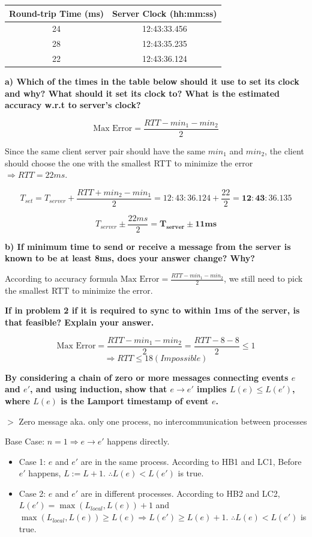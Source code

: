\documentclass[12pt,a4paper]{article}
\newcommand{\remark}[1]{
    $>$ {\color{blue} #1}
}
\begin{document}
\begin{center}
\begin{tabular}{|c|c|}
\hline
Round-trip Time (ms) & Server Clock (hh:mm:ss) \\ \hline
24 & 12:43:33.456 \\ \hline
28 & 12:43:35.235 \\ \hline
22 & 12:43:36.124 \\ \hline
\end{tabular}
\end{center}

\textbf{a) Which of the times in the table below should it use to set its clock and why? What should it set its clock to? What is the estimated accuracy w.r.t to server's clock?}

\[\text{Max Error} = \frac{RTT - min_1 - min_2}{2}\]

Since the same client server pair should have the same $min_1$ and $min_2$, the client should choose the one with the smallest RTT to minimize the error $\Rightarrow RTT = 22ms$.

\[T_{set} = T_{server} + \frac{RTT + min_2 - min_1}{2} = 12:43:36.124 + \frac{22}{2} = \mathbf{12:43:36.135}\]

\[T_{server} \pm \frac{22ms}{2} = \mathbf{T_{server} \pm 11ms}\]

\textbf{b) If minimum time to send or receive a message from the server is known to be at least 8ms, does your answer change? Why?}

According to accuracy formula $\text{Max Error} = \frac{RTT - min_1 - min_2}{2}$, we still need to pick the smallest RTT to minimize the error.

\textbf{If in problem 2 if it is required to sync to within 1ms of the server, is that feasible? Explain your answer.}

\[\text{Max Error} = \frac{RTT - min_1 - min_2}{2} = \frac{RTT - 8 - 8}{2} \le 1\]
\[\Rightarrow RTT \le 18 (Impossible)\]

\textbf{By considering a chain of zero or more messages connecting events $e$ and $e'$, and using induction, show that $e \to e'$ implies $L(e) \le L(e')$, where $L(e)$ is the Lamport timestamp of event $e$.}

\remark{Zero message aka. only one process, no intercommunication between processes}

Base Case: $n=1 \Rightarrow e \rightarrow e'$ happens directly.

\begin{itemize}
    \item Case 1: $e$ and $e'$ are in the same process. According to HB1 and LC1, Before $e'$ happens, $L := L + 1$. $\therefore L(e) < L(e')$ is true.
    \item Case 2: $e$ and $e'$ are in different processes. According to HB2 and LC2, $L(e') = \max(L_{local}, L(e)) + 1$ and $\max(L_{local}, L(e)) \ge L(e) \Rightarrow L(e') \ge L(e) + 1$. $\therefore L(e) < L(e')$ is true.
\end{itemize}
\end{document}
